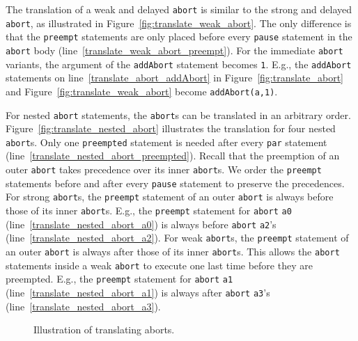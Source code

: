 The translation of a weak and delayed \verb$abort$ 
is similar to the strong and delayed \verb$abort$, 
as illustrated in Figure~\ref{fig:translate_weak_abort}. 
The only difference is that the \verb$preempt$ statements 
are only placed before every \verb$pause$ statement 
in the \verb$abort$ body (line~\ref{translate_weak_abort_preempt}). 
For the immediate \verb$abort$ variants, the \imm{} 
argument of the \verb$addAbort$ statement becomes
\verb$1$. E.g., the \verb$addAbort$ statements on 
line~\ref{translate_abort_addAbort} in Figure~\ref{fig:translate_abort} 
and Figure~\ref{fig:translate_weak_abort} become 
\verb$addAbort(a,1)$.

For nested \verb$abort$ statements, the \verb$abort$s 
can be translated in an arbitrary order. Figure~\ref{fig:translate_nested_abort}
illustrates the translation for four nested \verb$abort$s.
Only one \verb$preempted$ statement is needed after every 
\verb$par$ statement (line~\ref{translate_nested_abort_preempted}). 
Recall that the preemption of an outer \verb$abort$ takes 
precedence over its inner \verb$abort$s. We order the 
\verb$preempt$ statements before and after every \verb$pause$ 
statement to preserve the precedences. For strong \verb$abort$s,
the \verb$preempt$ statement of an outer \verb$abort$ is always 
before those of its inner \verb$abort$s. E.g., the \verb$preempt$
statement for \verb$abort$ \verb$a0$ (line~\ref{translate_nested_abort_a0}) 
is always before \verb$abort$ \verb$a2$'s (line~\ref{translate_nested_abort_a2}). 
For weak \verb$abort$s, the \verb$preempt$ statement of an outer 
\verb$abort$ is always after those of its inner \verb$abort$s. 
This allows the \verb$abort$ statements inside a weak \verb$abort$ 
to execute one last time before they are preempted. E.g., the 
\verb$preempt$ statement for \verb$abort$ \verb$a1$ 
(line~\ref{translate_nested_abort_a1}) is always after 
\verb$abort$ \verb$a3$'s (line~\ref{translate_nested_abort_a3}).

\begin{figure}
	\begin{minipage}[b]{0.45\textwidth}
		
	\end{minipage}
	\hfill
	
	\caption{Illustration of translating aborts.}
	\label{fig:translate_aborts}
\end{figure}


